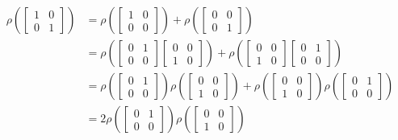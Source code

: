 \documentclass[]{article}
\begin{document}
\begin{align*}
	\rho\left(
	\begin{bmatrix}
		1 & 0 \\
		0 & 1 
	\end{bmatrix}
	\right)
	&=
	\rho\left(
	\begin{bmatrix}
		1 & 0 \\
		0 & 0 
	\end{bmatrix}\right)
	+
	\rho\left(
	\begin{bmatrix}
		0 & 0 \\
		0 & 1 
	\end{bmatrix}\right)
	\\
	&=
	\rho\left(
	\begin{bmatrix}
		0 & 1 \\
		0 & 0 
	\end{bmatrix}
	\begin{bmatrix}
		0 & 0 \\
		1 & 0 
	\end{bmatrix}
	\right)
	+
	\rho\left(
	\begin{bmatrix}
		0 & 0 \\
		1 & 0 
	\end{bmatrix}
	\begin{bmatrix}
		0 & 1 \\
		0 & 0 
	\end{bmatrix}
	\right)\\
	&=
	\rho\left(
	\begin{bmatrix}
		0 & 1 \\
		0 & 0 
	\end{bmatrix}\right)
	\rho
	\left(\begin{bmatrix}
		0 & 0 \\
		1 & 0 
	\end{bmatrix}\right)
	+
	\rho\left(
	\begin{bmatrix}
		0 & 0 \\
		1 & 0 
	\end{bmatrix}\right)
	\rho
	\left(\begin{bmatrix}
		0 & 1 \\
		0 & 0 
	\end{bmatrix}\right)\\
	&=
	2 \rho\left(
	\begin{bmatrix}
		0 & 1 \\
		0 & 0 
	\end{bmatrix}\right)
	\rho
	\left(\begin{bmatrix}
		0 & 0 \\
		1 & 0 
	\end{bmatrix}\right)
\end{align*}
\end{document}
